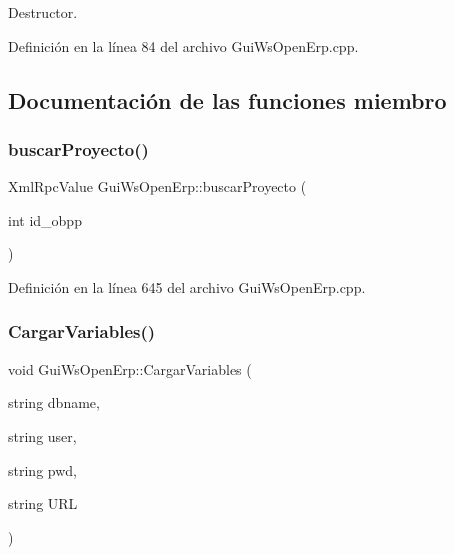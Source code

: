 Destructor. 



Definición en la línea 84 del archivo Gui\+Ws\+Open\+Erp.\+cpp.



\subsection{Documentación de las funciones miembro}
\hypertarget{classGuiWsOpenErp_a331ff67a1bff59ac435a372fbd08b04b}{}\label{classGuiWsOpenErp_a331ff67a1bff59ac435a372fbd08b04b} 
\subsubsection{\texorpdfstring{buscar\+Proyecto()}{buscarProyecto()}}
{\footnotesize\ttfamily Xml\+Rpc\+Value Gui\+Ws\+Open\+Erp\+::buscar\+Proyecto (\begin{DoxyParamCaption}\item[{int}]{id\+\_\+obpp }\end{DoxyParamCaption})\hspace{0.3cm}{\ttfamily [inline]}}



Definición en la línea 645 del archivo Gui\+Ws\+Open\+Erp.\+cpp.

\hypertarget{classGuiWsOpenErp_a72e93c46fcdf1317d7a554181f6e08e1}{}\label{classGuiWsOpenErp_a72e93c46fcdf1317d7a554181f6e08e1} 
\subsubsection{\texorpdfstring{Cargar\+Variables()}{CargarVariables()}}
{\footnotesize\ttfamily void Gui\+Ws\+Open\+Erp\+::\+Cargar\+Variables (\begin{DoxyParamCaption}\item[{string}]{dbname,  }\item[{string}]{user,  }\item[{string}]{pwd,  }\item[{string}]{U\+RL }\end{DoxyParamCaption})\hspace{0.3cm}{\ttfamily [inline]}}



